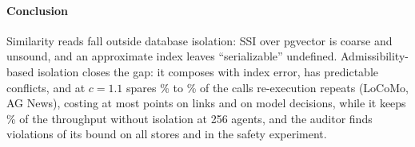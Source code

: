 \documentclass[sigconf, nonacm, review]{acmart}
\begin{document}
\paragraph{Conclusion}
Similarity reads fall outside database isolation: SSI over pgvector
is coarse and unsound, and an approximate index
leaves ``serializable'' undefined. Admissibility-based isolation closes
the gap: it composes with index error, has predictable conflicts, and
at $c=1.1$ spares \% to \% of
the calls re-execution repeats (LoCoMo, AG News), costing at most
 points on links and
 on model decisions, while it keeps
\% of the throughput without isolation at 256
agents, and the auditor finds  violations of its bound on all
 stores and in the safety experiment.



\end{document}

